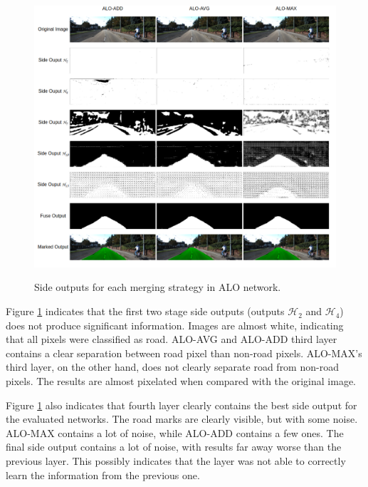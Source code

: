 \begin{figure}
  \caption{Side outputs for each merging strategy in ALO network.}
  \centering
  \includegraphics[width=1.0\textwidth]{figures/falreis/side_outputs.png}
  \label{fig:side_outputs}
\end{figure}

 

Figure \ref{fig:side_outputs} indicates that the first two stage side outputs (outputs $\mathcal{H}_2$ and $\mathcal{H}_4$) does not produce significant information. Images are almost white, indicating that all pixels were classified as road. ALO-AVG and ALO-ADD third layer contains a clear separation between road pixel than non-road pixels. ALO-MAX's third layer, on the other hand, does not clearly separate road from non-road pixels. The results are almost pixelated when compared with the original image.

Figure \ref{fig:side_outputs} also indicates that fourth layer clearly contains the best side output for the evaluated networks. The road marks are clearly visible, but with some noise. ALO-MAX contains a lot of noise, while ALO-ADD contains a few ones. The final side output contains a lot of noise, with results far away worse than the previous layer. This possibly indicates that the layer was not able to correctly learn the information from the previous one.

